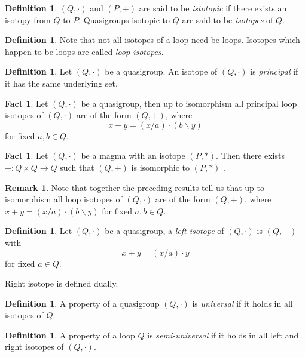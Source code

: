\documentclass[12pt, twoside, openright]{report}
\theoremstyle{definition}
\newtheorem{fct}[thm]{Fact}
\newtheorem{dfn}[thm]{Definition}
\newtheorem*{rmk}{Remark}
\newcommand{\ldv}{\backslash}       %
\newcommand{\rdv}{/}                %
\begin{document}
\begin{dfn}
  $(Q, \cdot)$ and $(P, +)$ are said to be \emph{istotopic} if there exists an isotopy from $Q$ to $P$. Quasigroups
    isotopic to $Q$ are said to be \emph{isotopes} of $Q$.
\end{dfn}

\begin{dfn}
  Note that not all isotopes of a loop need be loops. Isotopes which happen to be loops are called \emph{loop isotopes}.
\end{dfn}

\begin{dfn}
  Let $(Q, \cdot)$ be a quasigroup. An isotope of $(Q, \cdot)$ is \emph{principal} if it has the same underlying set.
\end{dfn}

\begin{fct}
  Let $(Q, \cdot)$ be a quasigroup, then up to isomorphism all principal loop isotopes of $(Q, \cdot)$ are of the
    form $(Q, +)$, where
  \[x + y = (x\rdv a)\cdot (b\ldv y)\]
  for fixed $a, b\in Q$\cite{Bruck}.
\end{fct}

\begin{fct}
  Let $(Q, \cdot)$ be a magma with an isotope $(P, *)$. Then there exists $+:Q\times Q\to Q$ such that $(Q, +)$ is
    isomorphic to $(P, *)$ \cite{Bruck}.
\end{fct}

\begin{rmk}
  Note that together the preceding results tell us that up to isomorphism all loop isotopes of $(Q, \cdot)$ are of the
    form $(Q, +)$, where $x + y = (x\rdv a)\cdot (b\ldv y)$ for fixed $a, b\in Q$.
\end{rmk}

\begin{dfn}
  Let $(Q, \cdot)$ be a quasigroup, a \emph{left isotope} of $(Q, \cdot)$ is $(Q, +)$ with
  \[x + y = (x\rdv a)\cdot y\]
  for fixed $a\in Q$.
\end{dfn}

Right isotope is defined dually.

\begin{dfn}
  A property of a quasigroup $(Q, \cdot)$ is \emph{universal} if it holds in all isotopes of $Q$.
\end{dfn}

\begin{dfn}
  A property of a loop $Q$ is \emph{semi-universal} if it holds in all left and right isotopes of $(Q, \cdot)$.
\end{dfn}
\end{document}
